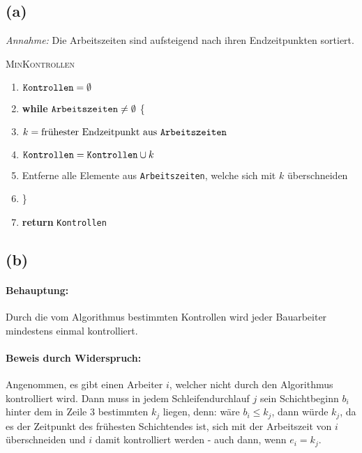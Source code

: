 \documentclass[a4paper,12pt]{article}
\begin{document}
\subsection*{(a)}
\textit{Annahme:} Die Arbeitszeiten sind aufsteigend nach ihren Endzeitpunkten sortiert.\\
\begin{mdframed}
\textsc{MinKontrollen}
\begin{enumerate}[itemsep=-1mm,label=\arabic*]
\item $\text{\texttt{Kontrollen}}=\emptyset$
\item \textbf{while} $\text{\texttt{Arbeitszeiten}}\neq\emptyset$ \{
\item \hspace{4mm} $k=\text{frühester Endzeitpunkt aus \texttt{Arbeitszeiten}}$
\item \hspace{4mm} $\text{\texttt{Kontrollen}}=\text{\texttt{Kontrollen}}\cup k$
\item \hspace{4mm} Entferne alle Elemente aus \texttt{Arbeitszeiten}, welche sich mit $k$ überschneiden
\item \}
\item \textbf{return} \texttt{Kontrollen}
\end{enumerate}
\end{mdframed}

\subsection*{(b)}
\paragraph*{Behauptung:} Durch die vom Algorithmus bestimmten Kontrollen wird jeder Bauarbeiter mindestens einmal kontrolliert.

\paragraph*{Beweis durch Widerspruch:} Angenommen, es gibt einen Arbeiter $i$, welcher nicht durch den Algorithmus kontrolliert wird. Dann muss in jedem Schleifendurchlauf $j$ sein Schichtbeginn $b_i$ hinter dem in Zeile 3 bestimmten $k_j$ liegen, denn: wäre $b_i\leq k_j$, dann würde $k_j$, da es der Zeitpunkt des frühesten Schichtendes ist, sich mit der Arbeitszeit von $i$ überschneiden und $i$ damit kontrolliert werden - auch dann, wenn $e_i=k_j$.
\end{document}
